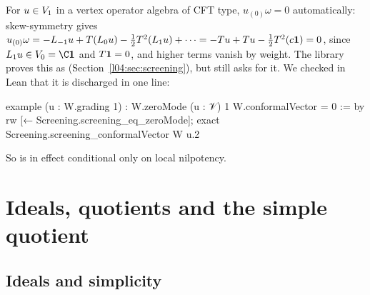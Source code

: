 \begin{remark}\label{l04:rem:homega}
For $u\in V_1$ in a vertex operator algebra of CFT type, $u_{(0)}\omega = 0$ automatically:
skew-symmetry gives $u_{(0)}\omega = -L_{-1}u + T(L_0u) - \tfrac12T^2(L_1u) + \cdots = -Tu + Tu -
\tfrac12T^2(c\mathbf{1}) = 0$, since $L_1u\in\lfourV_0 = \C\lfourvac$ and $T\mathbf{1} = 0$, and higher
terms vanish by weight. The library proves this as \allowbreak{}\allowbreak{}
(Section~\ref{l04:sec:screening}), but  still asks for it. We checked in Lean that it is
discharged in one line:
\begin{plaincode}
example (u : W.grading 1) : W.zeroMode (u : 𝒱) 1 W.conformalVector = 0 := by
  rw [← Screening.screening_eq_zeroMode]; exact Screening.screening_conformalVector W u.2
\end{plaincode}
So  is in effect conditional only on local nilpotency.
\end{remark}

\section{Ideals, quotients and the simple quotient}\label{l04:sec:quot}

\subsection{Ideals and simplicity}

